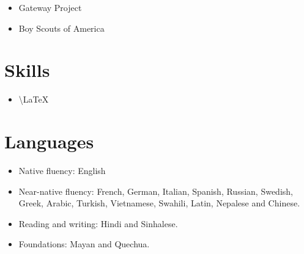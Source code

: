 \documentclass[margin,line]{res}
\def\tightlist{} %
\renewcommand{\subsection}[1]{\section{#1}}
\begin{document}
\begin{resume}
\begin{itemize}
\tightlist
\item
  Gateway Project
\item
  Boy Scouts of America
\end{itemize}

\hypertarget{skills}{%
\subsection{Skills}\label{skills}}

\begin{itemize}
\tightlist
\item
  \textbackslash{}LaTeX
\end{itemize}

\hypertarget{languages}{%
\subsection{Languages}\label{languages}}

\begin{itemize}
\tightlist
\item
  Native fluency: English
\item
  Near-native fluency: French, German, Italian, Spanish, Russian,
  Swedish, Greek, Arabic, Turkish, Vietnamese, Swahili, Latin, Nepalese
  and Chinese.
\item
  Reading and writing: Hindi and Sinhalese.
\item
  Foundations: Mayan and Quechua.
\end{itemize}
  \end{resume}
\end{document}
